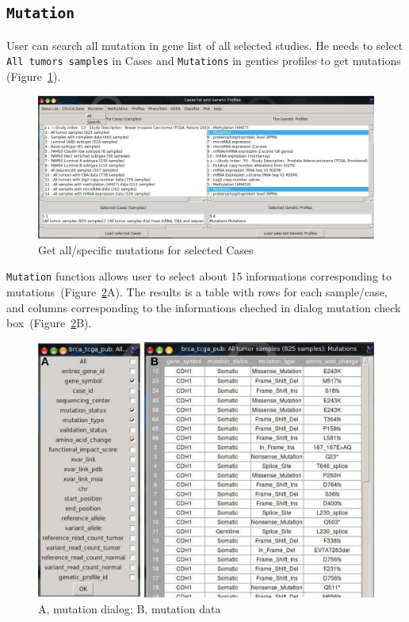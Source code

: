 \documentclass[a4paper]{article}
\begin{document}
\subsection{\texttt{Mutation}}

User can search  all mutation in gene list of all selected studies. He needs to select \texttt{All tumors samples} in Cases and \texttt{Mutations} in gentics profiles to get mutations (Figure~\ref{Fig5}).


\begin{figure}[!ht]
 \centering
\includegraphics[scale=1]{image/Mutation1.png}
\caption{Get all/specific mutations for selected Cases }
\label{Fig5}
\end{figure}

\texttt{Mutation} function allows user to select about 15 informations corresponding to mutations~(Figure~\ref{Fig6}A). The results is a table with rows for each sample/case, and columns corresponding to the informations cheched in dialog mutation check box~(Figure~\ref{Fig6}B).

\begin{figure}[!ht]
 \centering
\includegraphics[scale=1]{image/mutation.png}
\caption{A, mutation dialog; B, mutation data}
\label{Fig6}
\end{figure}
\end{document}
